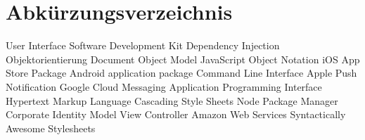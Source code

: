 
\chapter*{Abkürzungsverzeichnis}

\begin{acronym}
  {User Interface}
  {Software Development Kit}
  {Dependency Injection}
   {Objektorientierung}
   {Document Object Model}
   {JavaScript Object Notation}
   {iOS App Store Package}
   {Android application package}
   {Command Line Interface}
   {Apple Push Notification}
   {Google Cloud Messaging}
   {Application Programming Interface}
   {Hypertext Markup Language}
   {Cascading Style Sheets}
   {Node Package Manager}
   {Corporate Identity}
   {Model View Controller}
   {Amazon Web Services}
   {Syntactically Awesome Stylesheets}
\end{acronym}
